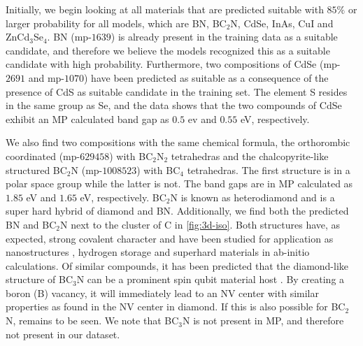 





\noindent Initially, we begin looking at all materials that are predicted suitable with $85\%$ or larger probability for all models, which are BN, BC$_2$N, CdSe, InAs, CuI and ZnCd$_3$Se$_4$. BN (mp-$1639$) is already present in the training data as a suitable candidate, and therefore we believe the models recognized this as a suitable candidate with high probability. Furthermore, two compositions of CdSe (mp-$2691$ and mp-$1070$) have been predicted as suitable as a consequence of the presence of CdS as suitable candidate in the training set. The element S resides in the same group as Se, and the data shows that the two compounds of CdSe exhibit an MP calculated band gap as $0.5$ ev and $0.55$ eV, respectively.

We also find two compositions with the same chemical formula, the orthorombic coordinated (mp-$629458$) with BC$_2$N$_2$ tetrahedras and the chalcopyrite-like structured BC$_2$N (mp-$1008523$) with BC$_4$ tetrahedras. The first structure is in a polar space group while the latter is not. The band gaps are in MP calculated as $1.85$ eV and $1.65$ eV, respectively. BC$_2$N is known as heterodiamond and is a super hard hybrid of diamond and BN. Additionally, we find both the predicted BN and BC$_2$N next to the cluster of C in \autoref{fig:3d-iso}.
Both structures have, as expected, strong covalent character and have been studied for application as nanostructures \cite{Gao2017}, hydrogen storage \cite{Cai2017} and superhard materials \cite{Li2017, Jiang2020} in ab-initio calculations. Of similar compounds, it has been predicted that the diamond-like structure of BC$_3$N can be a prominent spin qubit material host \cite{WangDuo2020Sqbo}. By creating a boron (B) vacancy, it will immediately lead to an NV center with similar properties as found in the NV center in diamond. If this is also possible for BC$_2$N, remains to be seen. We note that BC$_3$N is not present in MP, and therefore not present in our dataset.

